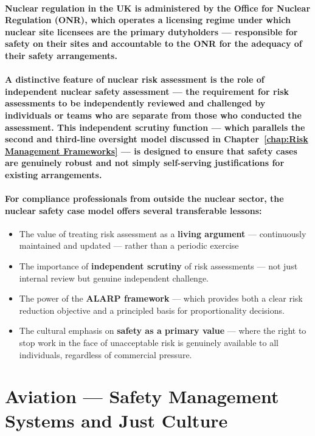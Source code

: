 \paragraph{Nuclear regulation in the UK is administered by the \textbf{Office for Nuclear Regulation (ONR)}, which operates a licensing regime under which nuclear site licensees are the primary dutyholders — responsible for safety on their sites and accountable to the ONR for the adequacy of their safety arrangements.}
\paragraph{A distinctive feature of nuclear risk assessment is the role of independent nuclear safety assessment — the requirement for risk assessments to be independently reviewed and challenged by individuals or teams who are separate from those who conducted the assessment. This independent scrutiny function — which parallels the second and third-line oversight model discussed in Chapter~\ref{chap:Risk Management Frameworks} — is designed to ensure that safety cases are genuinely robust and not simply self-serving justifications for existing arrangements.}
\paragraph{For compliance professionals from outside the nuclear sector, the nuclear safety case model offers several transferable lessons:}
\begin{itemize}
  \item{The value of treating risk assessment as a \textbf{living argument} — continuously maintained and updated — rather than a periodic exercise}
  \item{The importance of \textbf{independent scrutiny} of risk assessments — not just internal review but genuine independent challenge.}
  \item{The power of the \textbf{ALARP framework} — which provides both a clear risk reduction objective and a principled basis for proportionality decisions.}
  \item{The cultural emphasis on \textbf{safety as a primary value} — where the right to stop work in the face of unacceptable risk is genuinely available to all individuals, regardless of commercial pressure.}
\end{itemize}

\section{Aviation — Safety Management Systems and Just Culture}
